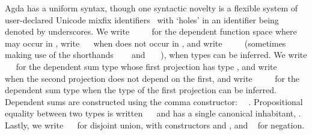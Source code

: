 Agda has a uniform syntax, though one syntactic novelty is a flexible system of user-declared Unicode mixfix identifiers~\cite{danielsson_parsing_2011} with `holes' in an identifier being denoted by underscores.
We write \AgdaSymbol{(}~\AgdaSymbol{:}~\AgdaSymbol{)}~~ for the dependent function space where  may occur in , write ~~ when  does not occur in , and write \AgdaSymbol{\{}~\AgdaSymbol{:}~\AgdaSymbol{\}}~~ (sometimes making use of the shorthands ~~~ and ~\AgdaSymbol{\{}\AgdaSymbol{\}}~~), when types can be inferred.
We write ~~ for the dependent sum type whose first projection has type , and write ~~ when the second projection does not depend on the first, and write ~~~~ for the dependent sum type when the type of the first projection can be inferred.
Dependent sums are constructed using the comma constructor: ~\AgdaInductiveConstructor{,}~.
Propositional equality between two types is written ~~ and has a single canonical inhabitant, .
Lastly, we write ~~ for disjoint union, with constructors  and , and ~ for negation.

